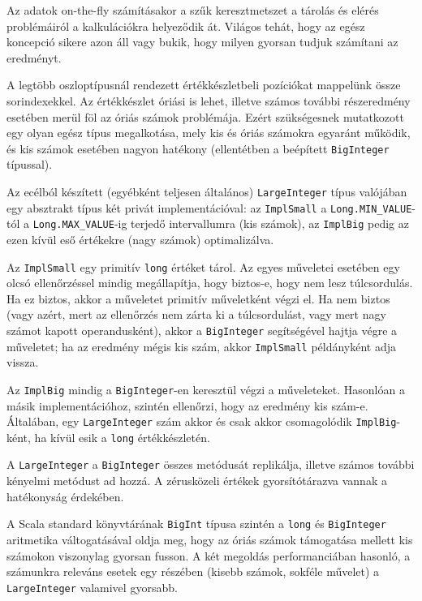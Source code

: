 \documentclass[
    parspace,
    noindent,
    nohyp,
]{elteiktdk}[2023/04/10]
\begin{document}
Az adatok on-the-fly számításakor a szűk keresztmetszet
a tárolás és elérés problémáiról a kalkulációkra helyeződik át.
Világos tehát, hogy az egész koncepció sikere azon áll vagy bukik,
hogy milyen gyorsan tudjuk számítani az eredményt.

A legtöbb oszloptípusnál rendezett értékkészletbeli pozíciókat mappelünk össze sorindexekkel.
Az értékkészlet óriási is lehet,
illetve számos további részeredmény esetében merül föl az óriás számok problémája.
Ezért szükségesnek mutatkozott egy olyan egész típus megalkotása,
mely kis és óriás számokra egyaránt működik,
és kis számok esetében nagyon hatékony (ellentétben a beépített \texttt{BigInteger} típussal).

Az ecélból készített (egyébként teljesen általános) \texttt{LargeInteger} típus
valójában egy absztrakt típus két privát implementációval:
az \texttt{ImplSmall} a \texttt{Long.MIN\_VALUE}-tól a \texttt{Long.MAX\_VALUE}-ig
terjedő intervallumra (kis számok),
az \texttt{ImplBig} pedig az ezen kívül eső értékekre (nagy számok) optimalizálva.

Az \texttt{ImplSmall} egy primitív \texttt{long} értéket tárol.
Az egyes műveletei esetében egy olcsó ellenőrzéssel mindig megállapítja,
hogy biztos-e, hogy nem lesz túlcsordulás.
Ha ez biztos, akkor a műveletet primitív műveletként végzi el.
Ha nem biztos
(vagy azért, mert az ellenőrzés nem zárta ki a túlcsordulást,
vagy mert nagy számot kapott operandusként),
akkor a \texttt{BigInteger} segítségével hajtja végre a műveletet;
ha az eredmény mégis kis szám, akkor \texttt{ImplSmall} példányként adja vissza.

Az \texttt{ImplBig} mindig a \texttt{BigInteger}-en keresztül végzi a műveleteket.
Hasonlóan a másik implementációhoz, szintén ellenőrzi, hogy az eredmény kis szám-e.
Általában, egy \texttt{LargeInteger} szám akkor és csak akkor csomagolódik \texttt{ImplBig}-ként,
ha kívül esik a \texttt{long} értékkészletén.

A \texttt{LargeInteger} a \texttt{BigInteger} összes metódusát replikálja,
illetve számos további kényelmi metódust ad hozzá.
A zérusközeli értékek gyorsítótárazva vannak a hatékonyság érdekében.

A Scala standard könyvtárának \texttt{BigInt} típusa szintén a \texttt{long} és \texttt{BigInteger}
aritmetika váltogatásával oldja meg,
hogy az óriás számok támogatása mellett kis számokon viszonylag gyorsan fusson.\cite{Rosset2019ScalaBigInt}
A két megoldás performanciában hasonló,
a számunkra releváns esetek egy részében (kisebb számok, sokféle művelet)
a \texttt{LargeInteger} valamivel gyorsabb.
\end{document}
